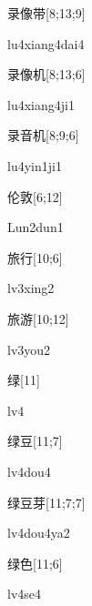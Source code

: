 \begin{verbete}{录像带}[8;13;9]
\begin{pronuncia}{lu4xiang4dai4}
\end{pronuncia}
\end{verbete}

\begin{verbete}[lu4xiang4ji1]{录像机}[8;13;6]
\begin{pronuncia}{lu4xiang4ji1}
\end{pronuncia}
\end{verbete}

\begin{verbete}[lu4yin1ji1]{录音机}[8;9;6]
\begin{pronuncia}{lu4yin1ji1}
\end{pronuncia}
\end{verbete}

\begin{verbete}{伦敦}[6;12]
\begin{pronuncia}{Lun2dun1}
\end{pronuncia}
\end{verbete}

\begin{verbete}[lv3xing2]{旅行}[10;6]
\begin{pronuncia}{lv3xing2}
\end{pronuncia}
\end{verbete}

\begin{verbete}[lv3you2]{旅游}[10;12]
\begin{pronuncia}{lv3you2}
\end{pronuncia}
\end{verbete}

\begin{verbete}[lv4]{绿}[11]
\begin{pronuncia}{lv4}
\end{pronuncia}
\end{verbete}

\begin{verbete}[lv4dou4]{绿豆}[11;7]
\begin{pronuncia}{lv4dou4}
\end{pronuncia}
\end{verbete}

\begin{verbete}[lv4dou4ya2]{绿豆芽}[11;7;7]
\begin{pronuncia}{lv4dou4ya2}
\end{pronuncia}
\end{verbete}

\begin{verbete}[lv4se4]{绿色}[11;6]
\begin{pronuncia}{lv4se4}
\end{pronuncia}
\end{verbete}

